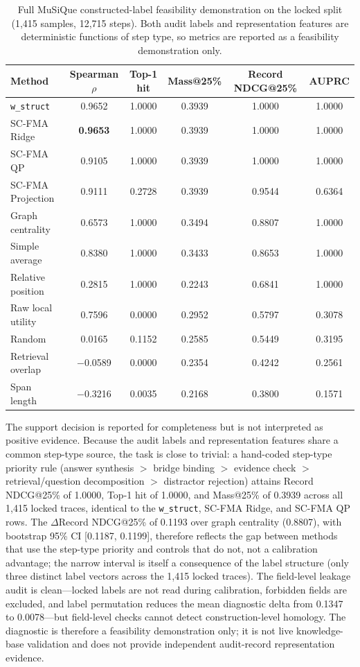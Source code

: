\documentclass[a4paper,fleqn]{cas-sc}
\begin{document}
\begin{table}[ht]
\caption{Full MuSiQue constructed-label feasibility demonstration on the locked split (1,415 samples, 12,715 steps). Both audit labels and representation features are deterministic functions of step type, so metrics are reported as a feasibility demonstration only.}
\label{tab:supp-musique-knowledge-audit}
\centering
\small
\begin{tabular}{lccccc}
\toprule
\textbf{Method} & \textbf{Spearman $\rho$} & \textbf{Top-1 hit} & \textbf{Mass@25\%} & \textbf{Record NDCG@25\%} & \textbf{AUPRC} \\
\midrule
\texttt{w\_struct} & 0.9652 & 1.0000 & 0.3939 & 1.0000 & 1.0000 \\
SC-FMA Ridge & \textbf{0.9653} & 1.0000 & 0.3939 & 1.0000 & 1.0000 \\
SC-FMA QP & 0.9105 & 1.0000 & 0.3939 & 1.0000 & 1.0000 \\
SC-FMA Projection & 0.9111 & 0.2728 & 0.3939 & 0.9544 & 0.6364 \\
Graph centrality & 0.6573 & 1.0000 & 0.3494 & 0.8807 & 1.0000 \\
Simple average & 0.8380 & 1.0000 & 0.3433 & 0.8653 & 1.0000 \\
Relative position & 0.2815 & 1.0000 & 0.2243 & 0.6841 & 1.0000 \\
Raw local utility & 0.7596 & 0.0000 & 0.2952 & 0.5797 & 0.3078 \\
Random & 0.0165 & 0.1152 & 0.2585 & 0.5449 & 0.3195 \\
Retrieval overlap & $-$0.0589 & 0.0000 & 0.2354 & 0.4242 & 0.2561 \\
Span length & $-$0.3216 & 0.0035 & 0.2168 & 0.3800 & 0.1571 \\
\bottomrule
\end{tabular}
\end{table}

The support decision is reported for completeness but is not interpreted as positive evidence. Because the audit labels and representation features share a common step-type source, the task is close to trivial: a hand-coded step-type priority rule (answer synthesis $>$ bridge binding $>$ evidence check $>$ retrieval/question decomposition $>$ distractor rejection) attains Record NDCG@25\% of 1.0000, Top-1 hit of 1.0000, and Mass@25\% of 0.3939 across all 1,415 locked traces, identical to the \texttt{w\_struct}, SC-FMA Ridge, and SC-FMA QP rows. The $\Delta$Record NDCG@25\% of 0.1193 over graph centrality (0.8807), with bootstrap 95\% CI [0.1187, 0.1199], therefore reflects the gap between methods that use the step-type priority and controls that do not, not a calibration advantage; the narrow interval is itself a consequence of the label structure (only three distinct label vectors across the 1,415 locked traces). The field-level leakage audit is clean---locked labels are not read during calibration, forbidden fields are excluded, and label permutation reduces the mean diagnostic delta from 0.1347 to 0.0078---but field-level checks cannot detect construction-level homology. The diagnostic is therefore a feasibility demonstration only; it is not live knowledge-base validation and does not provide independent audit-record representation evidence.
\end{document}
